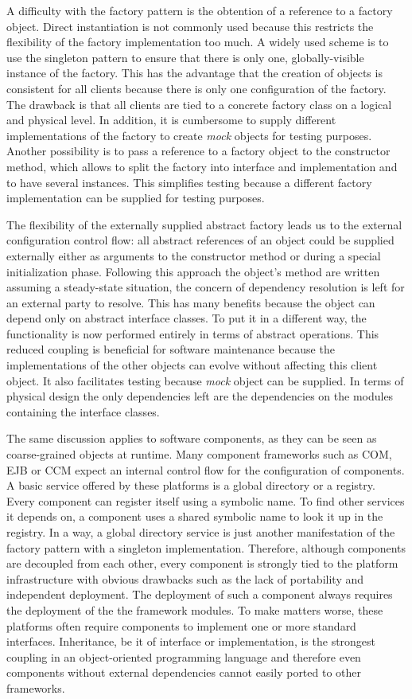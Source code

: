 A difficulty with the factory pattern is the obtention of a reference to a factory object. Direct instantiation is
not commonly used because this restricts the flexibility of the factory implementation too much. A widely
used scheme is to use the singleton pattern to ensure that there is only one, globally-visible instance of the
factory. This has the advantage that the creation of objects is consistent for all clients because there is only
one configuration of the factory. The drawback is that all clients are tied to a concrete factory class on a logical
and physical level. In addition, it is cumbersome to supply different implementations of the factory to
create \emph{mock} objects for testing purposes. Another possibility is to pass a reference to a factory object
to the constructor method, which allows to split the factory into interface and implementation and to have several
instances. This simplifies testing because a different factory implementation can be supplied for testing purposes.

The flexibility of the externally supplied abstract factory leads us to the external configuration control flow:
all abstract references of an object could be supplied externally either as arguments to the constructor method
or during a special initialization phase. Following this approach the object's method are written assuming a
steady-state situation, the concern of dependency resolution is left for an external party to resolve. This has
many benefits because the object can depend only on abstract interface classes. To put it in a different way, the
functionality is now performed entirely in terms of abstract operations. This reduced coupling is beneficial for
software maintenance because the implementations of the other objects can evolve without affecting this client
object. It also facilitates testing because \emph{mock} object can be supplied. In terms of physical design
the only dependencies left are the dependencies on the modules containing the interface classes.

The same discussion applies to software components, as they can be seen as coarse-grained objects at runtime. Many
component frameworks such as COM, EJB or CCM expect an internal control flow for the configuration of components.
A basic service offered by these platforms is a global directory or a registry. Every component can register
itself using a symbolic name. To find other services it depends on, a component uses a shared symbolic name
to look it up in the registry. In a way, a global directory service is just another manifestation of the factory
pattern with a singleton implementation. Therefore, although components are decoupled from each other, every component
is strongly tied to the platform infrastructure with obvious drawbacks such as the lack of portability and independent
deployment. The deployment of such a component always requires the deployment of the the framework modules.
To make matters worse, these platforms often require components to implement one or more standard interfaces.
Inheritance, be it of interface or implementation, is the strongest coupling in an object-oriented programming language
and therefore even components without external dependencies cannot easily ported to other frameworks.

